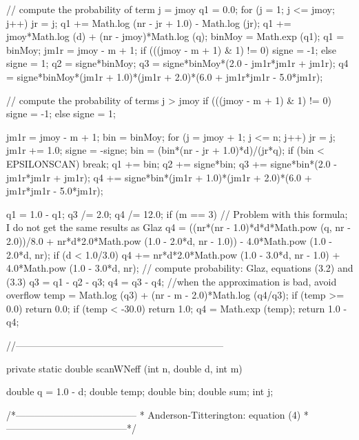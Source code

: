 \begin{code}
\begin{hide}
{{      // compute the probability of term j = jmoy
      q1 = 0.0;
      for (j = 1; j <= jmoy; j++) {
         jr = j;
         q1 += Math.log (nr - jr + 1.0) - Math.log (jr);
      }
      q1 += jmoy*Math.log (d) + (nr - jmoy)*Math.log (q);
      binMoy = Math.exp (q1);
      q1 = binMoy;
      jm1r = jmoy - m + 1;
      if (((jmoy - m + 1) & 1) != 0)
         signe = -1;
      else
         signe = 1;
      q2 = signe*binMoy;
      q3 = signe*binMoy*(2.0 - jm1r*jm1r + jm1r);
      q4 = signe*binMoy*(jm1r + 1.0)*(jm1r + 2.0)*(6.0 + jm1r*jm1r -
         5.0*jm1r);

      // compute the probability of terms j > jmoy
      if (((jmoy - m + 1) & 1) != 0)
         signe = -1;
      else
         signe = 1;

      jm1r = jmoy - m + 1;
      bin = binMoy;
      for (j = jmoy + 1; j <= n; j++) {
         jr = j;
         jm1r += 1.0;
         signe = -signe;
         bin = (bin*(nr - jr + 1.0)*d)/(jr*q);
         if (bin < EPSILONSCAN)
            break;
         q1 += bin;
         q2 += signe*bin;
         q3 += signe*bin*(2.0 - jm1r*jm1r + jm1r);
         q4 += signe*bin*(jm1r + 1.0)*(jm1r + 2.0)*(6.0 + jm1r*jm1r -
            5.0*jm1r);
      }

      q1 = 1.0 - q1;
      q3 /= 2.0;
      q4 /= 12.0;
      if (m == 3) {
        // Problem with this formula; I do not get the same results as Glaz
         q4 = ((nr*(nr - 1.0)*d*d*Math.pow (q, nr - 2.0))/8.0
            + nr*d*2.0*Math.pow (1.0 - 2.0*d, nr - 1.0))
            - 4.0*Math.pow (1.0 - 2.0*d, nr);
         if (d < 1.0/3.0) {
            q4 += nr*d*2.0*Math.pow (1.0 - 3.0*d, nr - 1.0)
                  + 4.0*Math.pow (1.0 - 3.0*d, nr);
         }
      }
      // compute probability: Glaz, equations (3.2) and (3.3)
      q3 = q1 - q2 - q3;
      q4 = q3 - q4;
      //when the approximation is bad, avoid overflow
      temp = Math.log (q3) + (nr - m - 2.0)*Math.log (q4/q3);
      if (temp >= 0.0)
         return 0.0;
      if (temp < -30.0)
         return 1.0;
      q4 = Math.exp (temp);
      return 1.0 - q4;
     }

     //-----------------------------------------------------------------

     private static double scanWNeff (int n, double d, int m) {
      double q = 1.0 - d;
      double temp;
      double bin;
      double sum;
      int j;

      /*--------------------------------------
       * Anderson-Titterington: equation (4)
       *--------------------------------------*/

}}
\end{hide}
\end{code}
